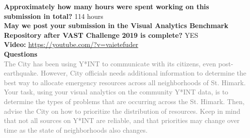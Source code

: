 \documentclass{article}
\begin{document}
\noindent
\textbf{Approximately how many hours were spent working on this submission in
total?} 114 hours \\

\noindent
\textbf{May we post your submission in the Visual Analytics Benchmark Repository
after VAST Challenge 2019 is complete?} YES \\

\noindent
\textbf{Video:} \url{https://youtube.com/?v=vaietefuder}\\

\noindent
\textbf{Questions} \\
\footnotesize{\textcolor{gray}{The City has been using Y*INT to communicate with
its citizens, even post-earthquake. However, City officials needs additional
information to determine the best way to allocate emergency resources across all
neighborhoods of St. Himark. Your task, using your visual analytics on the
community Y*INT data, is to determine the types of problems that are occurring
across the St.  Himark. Then, advise the City on how to prioritize the
distribution of resources. Keep in mind that not all sources on Y*INT are
reliable, and that priorities may change over time as the state of neighborhoods
also changes.}}
\end{document}
